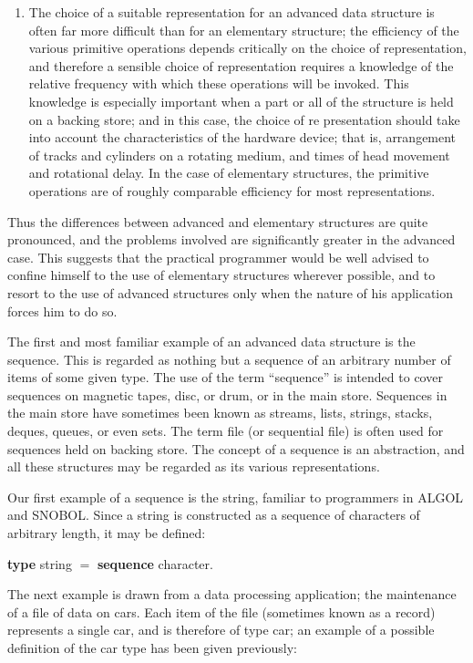 \begin{enumerate}[leftmargin=2\parindent, label=(\arabic*)]
	\item The choice of a suitable representation for an advanced data structure is often far more difficult than for an elementary structure; the efficiency of the various primitive operations depends critically on the choice of representation, and therefore a sensible choice of representation requires a knowledge of the relative frequency with which these operations will be invoked. This knowledge is especially important when a part or all of the structure is held on a backing store; and in this case, the choice of re presentation should take into account the characteristics of the hardware device; that is, arrangement of tracks and cylinders on a rotating medium, and times of head movement and rotational delay. In the case of elementary structures, the primitive operations are of roughly comparable efficiency for most representations.
\end{enumerate}

Thus the differences between advanced and elementary structures are quite pronounced, and the problems involved are significantly greater in the advanced case. This suggests that the practical programmer would be well advised to confine himself to the use of elementary structures wherever possible, and to resort to the use of advanced structures only when the nature of his application forces him to do so.

The first and most familiar example of an advanced data structure is the sequence. This is regarded as nothing but a sequence of an arbitrary number of items of some given type. The use of the term ``sequence'' is intended to cover sequences on magnetic tapes, disc, or drum, or in the main store. Sequences in the main store have sometimes been known as streams, lists, strings, stacks, deques, queues, or even sets. The term file (or sequential file) is often used for sequences held on backing store. The concept of a sequence is an abstraction, and all these structures may be regarded as its various representations.

Our first example of a sequence is the string, familiar to programmers in ALGOL and SNOBOL. Since a string is constructed as a sequence of characters of arbitrary length, it may be defined:

\quad \textbf{type} string $=$ \textbf{sequence} character.

The next example is drawn from a data processing application; the maintenance of a file of data on cars. Each item of the file (sometimes known as a record) represents a single car, and is therefore of type car; an example of a possible definition of the car type has been given previously:

